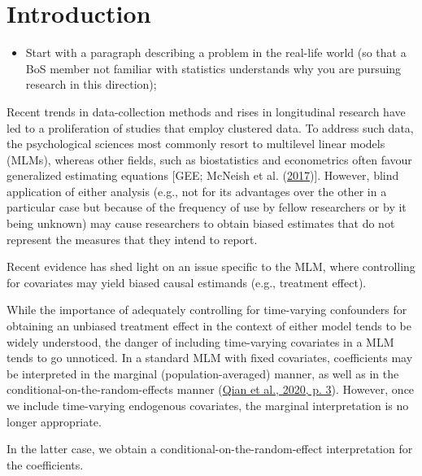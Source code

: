 \documentclass[
  12pt,
  a4paper,
]{article}
\providecommand{\tightlist}{%
  \setlength{\itemsep}{0pt}\setlength{\parskip}{0pt}}\usepackage{longtable,booktabs,array}
\begin{document}
\pagestyle{fancy}
  \fancyhead{}


\newpage

\hypertarget{introduction}{%
\section{Introduction}\label{introduction}}

\begin{itemize}
\tightlist
\item
  Start with a paragraph describing a problem in the real-life world (so
  that a BoS member not familiar with statistics understands why you are
  pursuing research in this direction);
\end{itemize}

Recent trends in data-collection methods and rises in longitudinal
research have led to a proliferation of studies that employ clustered
data. To address such data, the psychological sciences most commonly
resort to multilevel linear models (MLMs), whereas other fields, such as
biostatistics and econometrics often favour generalized estimating
equations {[}GEE; McNeish et al.
(\protect\hyperlink{ref-mcneish2017}{2017}){]}. However, blind
application of either analysis (e.g., not for its advantages over the
other in a particular case but because of the frequency of use by fellow
researchers or by it being unknown) may cause researchers to obtain
biased estimates that do not represent the measures that they intend to
report.

Recent evidence has shed light on an issue specific to the MLM, where
controlling for covariates may yield biased causal estimands (e.g.,
treatment effect).

While the importance of adequately controlling for time-varying
confounders for obtaining an unbiased treatment effect in the context of
either model tends to be widely understood, the danger of including
time-varying covariates in a MLM tends to go unnoticed. In a standard
MLM with fixed covariates, coefficients may be interpreted in the
marginal (population-averaged) manner, as well as in the
conditional-on-the-random-effects manner
(\protect\hyperlink{ref-qian2020}{Qian et al., 2020, p. 3}). However,
once we include time-varying endogenous covariates, the marginal
interpretation is no longer appropriate.

In the latter case, we obtain a conditional-on-the-random-effect
interpretation for the coefficients.
\end{document}
